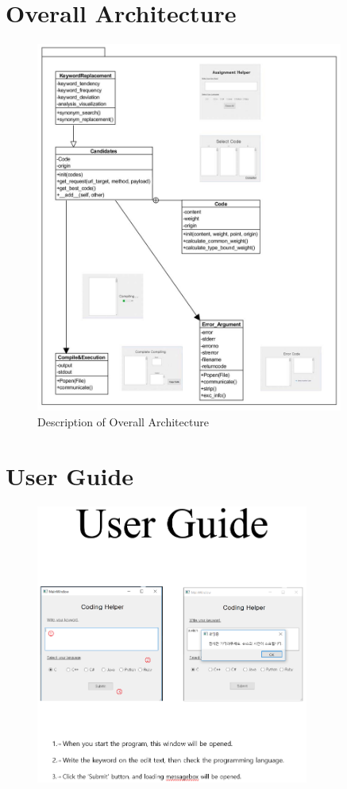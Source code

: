 \documentclass[conference]{IEEEtran}
\begin{document}
\section{Overall Architecture}
\begin{figure}[ht]
\centering
\includegraphics[width=0.9\textwidth]{./figures/overall_arch.jpg}
\caption{Description of Overall Architecture}
\label{overall}
\end{figure}

\pagebreak

\section{User Guide}
\label{user_guide}
\begin{figure}[ht]
\centering
\includegraphics[width=0.8\textwidth]{./figures/1-3.png}
\caption{}
\label{user1}
\end{figure}
\end{document}
